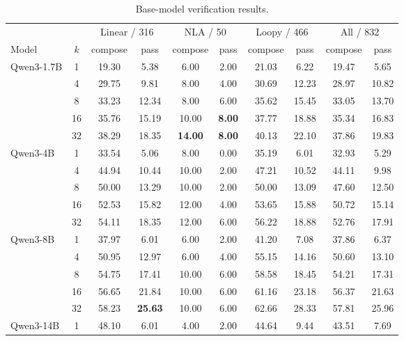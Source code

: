 \begin{table}[H]
\centering
\small
\caption{Base-model verification results.}
\label{tab:probe-complete}
\begin{tabular}{lccccccccc}
\toprule
\rowcolor{algobg}
& & \multicolumn{2}{c}{Linear / 316} & \multicolumn{2}{c}{NLA / 50}
  & \multicolumn{2}{c}{Loopy / 466} & \multicolumn{2}{c}{All / 832} \\
\headercmidrules{\cmidrule(lr){3-4}\cmidrule(lr){5-6}\cmidrule(lr){7-8}\cmidrule(lr){9-10}}
\rowcolor{algobg}
Model & \(k\) & compose & pass & compose & pass & compose & pass & compose & pass \\
\midrule
\multirow{5}{*}{Qwen3-1.7B}
 & 1  & 19.30 & 5.38 & 6.00 & 2.00 & 21.03 & 6.22 & 19.47 & 5.65 \\
 & 4  & 29.75 & 9.81 & 8.00 & 4.00 & 30.69 & 12.23 & 28.97 & 10.82 \\
 & 8  & 33.23 & 12.34 & 8.00 & 6.00 & 35.62 & 15.45 & 33.05 & 13.70 \\
 & 16 & 35.76 & 15.19 & 10.00 & \textbf{8.00} & 37.77 & 18.88 & 35.34 & 16.83 \\
 & 32 & 38.29 & 18.35 & \textbf{14.00} & \textbf{8.00} & 40.13 & 22.10 & 37.86 & 19.83 \\
\cmidrule(l{3pt}r{3pt}){1-10}
\multirow{5}{*}{Qwen3-4B}
 & 1  & 33.54 & 5.06 & 8.00 & 0.00 & 35.19 & 6.01 & 32.93 & 5.29 \\
 & 4  & 44.94 & 10.44 & 10.00 & 2.00 & 47.21 & 10.52 & 44.11 & 9.98 \\
 & 8  & 50.00 & 13.29 & 10.00 & 2.00 & 50.00 & 13.09 & 47.60 & 12.50 \\
 & 16 & 52.53 & 15.82 & 12.00 & 4.00 & 53.65 & 15.88 & 50.72 & 15.14 \\
 & 32 & 54.11 & 18.35 & 12.00 & 6.00 & 56.22 & 18.88 & 52.76 & 17.91 \\
\cmidrule(l{3pt}r{3pt}){1-10}
\multirow{5}{*}{Qwen3-8B}
 & 1  & 37.97 & 6.01 & 6.00 & 2.00 & 41.20 & 7.08 & 37.86 & 6.37 \\
 & 4  & 50.95 & 12.97 & 6.00 & 4.00 & 55.15 & 14.16 & 50.60 & 13.10 \\
 & 8  & 54.75 & 17.41 & 10.00 & 6.00 & 58.58 & 18.45 & 54.21 & 17.31 \\
 & 16 & 56.65 & 21.84 & 10.00 & 6.00 & 61.16 & 23.18 & 56.37 & 21.63 \\
 & 32 & 58.23 & \textbf{25.63} & 10.00 & 6.00 & 62.66 & 28.33 & 57.81 & 25.96 \\
\cmidrule(l{3pt}r{3pt}){1-10}
\multirow{5}{*}{Qwen3-14B}
 & 1  & 48.10 & 6.01 & 4.00 & 2.00 & 44.64 & 9.44 & 43.51 & 7.69 \\

\end{tabular}
\end{table}
